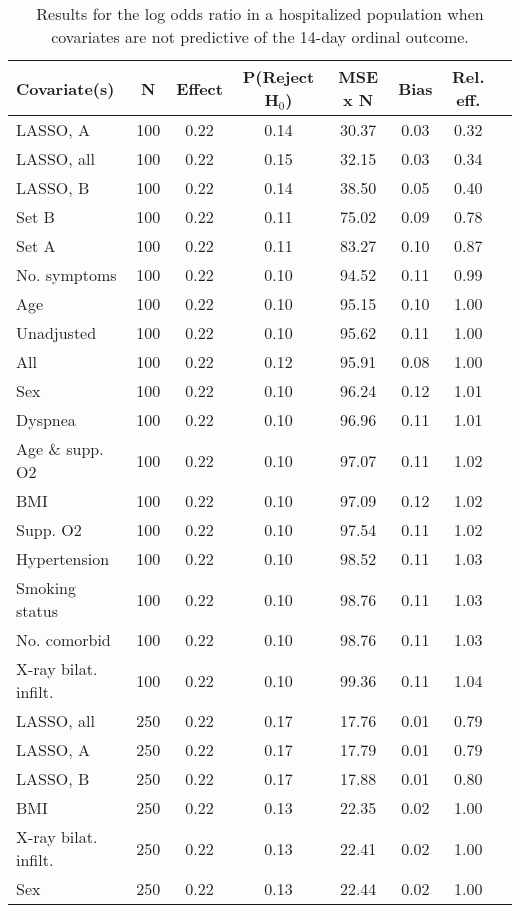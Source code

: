 \documentclass{article}
\begin{document}
{\tabcolsep=6pt  %
\begin{longtable}{lccccccc}
\caption{Results for the log odds ratio in a hospitalized population when covariates are not predictive of the 14-day ordinal outcome.}\label{tab20}\\
Covariate(s) & N & Effect & P(Reject H$_0$) & MSE x N & Bias & Rel. eff.\\ \midrule
LASSO, A & 100 & 0.22 & 0.14 & 30.37 & 0.03 & 0.32\\
LASSO, all & 100 & 0.22 & 0.15 & 32.15 & 0.03 & 0.34\\
LASSO, B & 100 & 0.22 & 0.14 & 38.50 & 0.05 & 0.40\\
Set B & 100 & 0.22 & 0.11 & 75.02 & 0.09 & 0.78\\
Set A & 100 & 0.22 & 0.11 & 83.27 & 0.10 & 0.87\\
No. symptoms & 100 & 0.22 & 0.10 & 94.52 & 0.11 & 0.99\\
Age & 100 & 0.22 & 0.10 & 95.15 & 0.10 & 1.00\\
Unadjusted & 100 & 0.22 & 0.10 & 95.62 & 0.11 & 1.00\\
All & 100 & 0.22 & 0.12 & 95.91 & 0.08 & 1.00\\
Sex & 100 & 0.22 & 0.10 & 96.24 & 0.12 & 1.01\\
Dyspnea & 100 & 0.22 & 0.10 & 96.96 & 0.11 & 1.01\\
Age \& supp. O2 & 100 & 0.22 & 0.10 & 97.07 & 0.11 & 1.02\\
BMI & 100 & 0.22 & 0.10 & 97.09 & 0.12 & 1.02\\
Supp. O2 & 100 & 0.22 & 0.10 & 97.54 & 0.11 & 1.02\\
Hypertension & 100 & 0.22 & 0.10 & 98.52 & 0.11 & 1.03\\
Smoking status & 100 & 0.22 & 0.10 & 98.76 & 0.11 & 1.03\\
No. comorbid & 100 & 0.22 & 0.10 & 98.76 & 0.11 & 1.03\\
X-ray bilat. infilt. & 100 & 0.22 & 0.10 & 99.36 & 0.11 & 1.04\\ \midrule
LASSO, all & 250 & 0.22 & 0.17 & 17.76 & 0.01 & 0.79\\
LASSO, A & 250 & 0.22 & 0.17 & 17.79 & 0.01 & 0.79\\
LASSO, B & 250 & 0.22 & 0.17 & 17.88 & 0.01 & 0.80\\
BMI & 250 & 0.22 & 0.13 & 22.35 & 0.02 & 1.00\\
X-ray bilat. infilt. & 250 & 0.22 & 0.13 & 22.41 & 0.02 & 1.00\\
Sex & 250 & 0.22 & 0.13 & 22.44 & 0.02 & 1.00\\

\end{longtable}}
\end{document}
